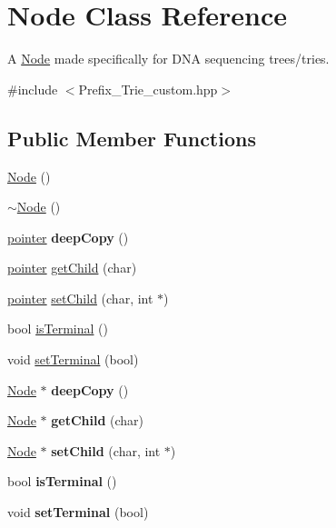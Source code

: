 \hypertarget{class_node}{}\section{Node Class Reference}
\label{class_node}


A \hyperlink{class_node}{Node} made specifically for D\+NA sequencing trees/tries.  




{\ttfamily \#include $<$Prefix\+\_\+\+Trie\+\_\+custom.\+hpp$>$}

\subsection*{Public Member Functions}
\begin{DoxyCompactItemize}
\item 
\hyperlink{class_node_ad7a34779cad45d997bfd6d3d8043c75f}{Node} ()
\item 
\hyperlink{class_node_aa0840c3cb5c7159be6d992adecd2097c}{$\sim$\+Node} ()
\item 
\mbox{\label{class_node_a50cc8a8f7579baecb23595338140ef87}} 
\hyperlink{structpointer}{pointer} {\bfseries deep\+Copy} ()
\item 
\hyperlink{structpointer}{pointer} \hyperlink{class_node_a7d2c9441ae9f243e06d9f081bada8bad}{get\+Child} (char)
\item 
\hyperlink{structpointer}{pointer} \hyperlink{class_node_aeb419eb3d59dba25f792546a226643bc}{set\+Child} (char, int $\ast$)
\item 
bool \hyperlink{class_node_a8cdae92d062555a32b908bfeae6149da}{is\+Terminal} ()
\item 
void \hyperlink{class_node_a6b9cb87985f29025ad3a2905f61e94c3}{set\+Terminal} (bool)
\item 
\mbox{\label{class_node_a3d977b8e9de6d22bec1ab0e9962a2c41}} 
\hyperlink{class_node}{Node} $\ast$ {\bfseries deep\+Copy} ()
\item 
\mbox{\label{class_node_a8029130c13b941a582c6a7f29648fa36}} 
\hyperlink{class_node}{Node} $\ast$ {\bfseries get\+Child} (char)
\item 
\mbox{\label{class_node_a7ae9ef44097095d0e7d5923fe329523a}} 
\hyperlink{class_node}{Node} $\ast$ {\bfseries set\+Child} (char, int $\ast$)
\item 
\mbox{\label{class_node_a8cdae92d062555a32b908bfeae6149da}} 
bool {\bfseries is\+Terminal} ()
\item 
\mbox{\label{class_node_a6b9cb87985f29025ad3a2905f61e94c3}} 
void {\bfseries set\+Terminal} (bool)
\end{DoxyCompactItemize}


